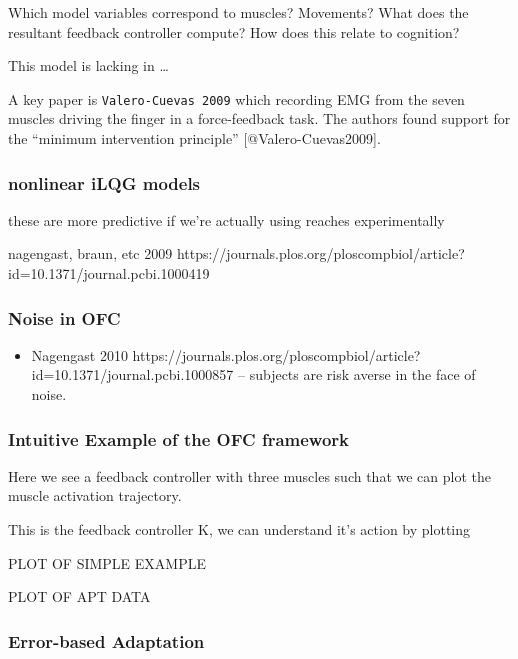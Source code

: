 \documentclass[../main.tex]{subfiles}
\begin{document}
Which model variables correspond to muscles? Movements? What does the
resultant feedback controller compute? How does this relate to
cognition?

This model is lacking in \ldots{}

A key paper is \texttt{Valero-Cuevas\ 2009} which recording EMG from the
seven muscles driving the finger in a force-feedback task. The authors
found support for the ``minimum intervention principle''
{[}@Valero-Cuevas2009{]}.

\subsubsection{nonlinear iLQG models}\label{nonlinear-ilqg-models}

these are more predictive if we're actually using reaches experimentally

nagengast, braun, etc 2009
https://journals.plos.org/ploscompbiol/article?id=10.1371/journal.pcbi.1000419

\subsubsection{Noise in OFC}\label{noise-in-ofc}

\begin{itemize}
\tightlist
\item
  Nagengast 2010
  https://journals.plos.org/ploscompbiol/article?id=10.1371/journal.pcbi.1000857
  -- subjects are risk averse in the face of noise.
\end{itemize}

\subsubsection{Intuitive Example of the OFC
framework}\label{intuitive-example-of-the-ofc-framework}

Here we see a feedback controller with three muscles such that we can
plot the muscle activation trajectory.

This is the feedback controller K, we can understand it's action by
plotting

PLOT OF SIMPLE EXAMPLE

PLOT OF APT DATA

\subsubsection{Error-based Adaptation}\label{error-based-adaptation}
\end{document}
